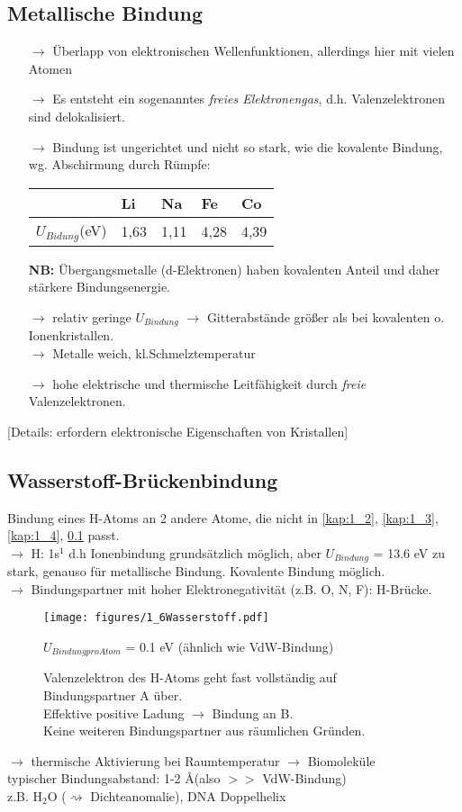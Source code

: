 \subsection{Metallische Bindung} %
\label{kap:1_5}
\begin{itemize}
	\item[$\rightarrow$] Überlapp von elektronischen Wellenfunktionen, allerdings hier mit vielen Atomen
	\item[$\rightarrow$] Es entsteht ein sogenanntes \textit{freies Elektronengas}, d.h. Valenzelektronen sind delokalisiert.
	\item[$\rightarrow$] Bindung ist ungerichtet und nicht so stark, wie die kovalente Bindung, wg. Abschirmung durch Rümpfe:
	\begin{table}[H]
		\centering
		\begin{tabular}{l|l|l|l|l}
						 & Li   & Na   & Fe   & Co   \\
						 \hline
		$U_{Bidung}$(eV) & 1,63 & 1,11 & 4,28 & 4,39 \\    
		\end{tabular}
		\end{table}
	\textbf{NB:} Übergangsmetalle (d-Elektronen)  haben kovalenten Anteil und daher stärkere Bindungsenergie.
	\item[$\rightarrow$] relativ geringe $U_{Bindung}$ $\rightarrow$ Gitterabstände größer als bei kovalenten o. Ionenkristallen.\\
	$\rightarrow$ Metalle weich, kl.Schmelztemperatur
	\item[$\rightarrow$] hohe elektrische und thermische Leitfähigkeit durch \textit{freie} Valenzelektronen.
\end{itemize}
[Details: erfordern elektronische Eigenschaften von Kristallen]

\subsection{Wasserstoff-Brückenbindung} %
\label{kap:1_6}
Bindung eines H-Atoms an 2 andere Atome, die nicht in \ref{kap:1_2}, \ref{kap:1_3}, \ref{kap:1_4}, \ref{kap:1_5}%
passt.\\
$\rightarrow$ H: 1s$^1$ d.h Ionenbindung grundsätzlich möglich, aber $U_{Bindung}$ = 13.6 eV zu stark, genauso für metallische Bindung. Kovalente Bindung möglich. \\
$\rightarrow$ Bindungspartner mit hoher Elektronegativität (z.B. O, N, F): H-Brücke.
\begin{figure}[H]
	\centering
	\texttt{[image: figures/1\_6Wasserstoff.pdf]}
	\caption{Valenzelektron des H-Atoms geht fast vollständig auf Bindungspartner A über.\\
	Effektive positive Ladung $\rightarrow$ Bindung an B.\\
	Keine weiteren Bindungspartner aus räumlichen Gründen.}
	$U_{Bindung pro Atom}$ = 0.1 eV (ähnlich wie VdW-Bindung)
	\label{}
\end{figure}

$\rightarrow$ thermische Aktivierung bei Raumtemperatur $\rightarrow$ Biomoleküle\\
typischer Bindungsabstand: 1-2 \AA (also $>>$ VdW-Bindung)\\
z.B. H$_2$O ($\rightsquigarrow$ Dichteanomalie), DNA Doppelhelix
